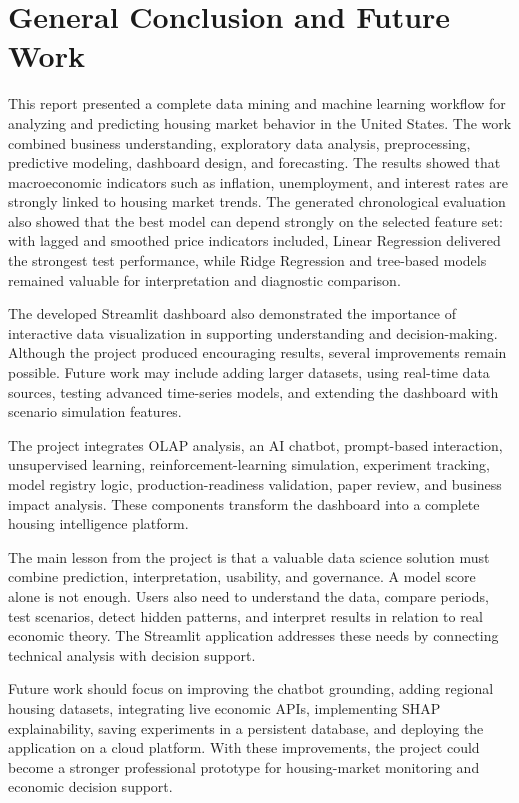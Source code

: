 \documentclass[a4paper, oneside, 12pt, final]{extreport}
\begin{document}
\chapter*{General Conclusion and Future Work}
\label{chap:conclusion}
%
This report presented a complete data mining and machine learning workflow for analyzing and predicting housing market behavior in the United States.
The work combined business understanding, exploratory data analysis, preprocessing, predictive modeling, dashboard design, and forecasting.
The results showed that macroeconomic indicators such as inflation, unemployment, and interest rates are strongly linked to housing market trends.
The generated chronological evaluation also showed that the best model can depend strongly on the selected feature set: with lagged and smoothed price indicators included, Linear Regression delivered the strongest test performance, while Ridge Regression and tree-based models remained valuable for interpretation and diagnostic comparison.

The developed Streamlit dashboard also demonstrated the importance of interactive data visualization in supporting understanding and decision-making.
Although the project produced encouraging results, several improvements remain possible.
Future work may include adding larger datasets, using real-time data sources, testing advanced time-series models, and extending the dashboard with scenario simulation features.

The project integrates OLAP analysis, an AI chatbot, prompt-based interaction, unsupervised learning, reinforcement-learning simulation, experiment tracking, model registry logic, production-readiness validation, paper review, and business impact analysis. These components transform the dashboard into a complete housing intelligence platform.

The main lesson from the project is that a valuable data science solution must combine prediction, interpretation, usability, and governance. A model score alone is not enough. Users also need to understand the data, compare periods, test scenarios, detect hidden patterns, and interpret results in relation to real economic theory. The Streamlit application addresses these needs by connecting technical analysis with decision support.

Future work should focus on improving the chatbot grounding, adding regional housing datasets, integrating live economic APIs, implementing SHAP explainability, saving experiments in a persistent database, and deploying the application on a cloud platform. With these improvements, the project could become a stronger professional prototype for housing-market monitoring and economic decision support.
\end{document}
